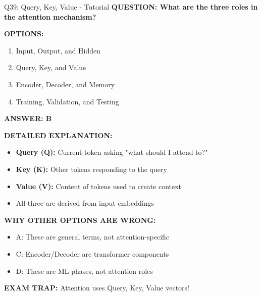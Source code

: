 \documentclass[8pt]{beamer}
\begin{document}
	\begin{frame}{Q39: Query, Key, Value - Tutorial}
		\fontsize{6.5}{7.5}\selectfont
		\textbf{QUESTION: What are the three roles in the attention mechanism?}
		
		\vspace{0.1cm}
		\textbf{OPTIONS:}
		\begin{enumerate}
			\item Input, Output, and Hidden
			\item Query, Key, and Value
			\item Encoder, Decoder, and Memory
			\item Training, Validation, and Testing
		\end{enumerate}
		
		\vspace{0.1cm}
		\textcolor{myblue}{\textbf{ANSWER: B}}
		
		\vspace{0.1cm}
		\textbf{DETAILED EXPLANATION:}
		\begin{itemize}
			\item \textbf{Query (Q):} Current token asking "what should I attend to?"
			\item \textbf{Key (K):} Other tokens responding to the query
			\item \textbf{Value (V):} Content of tokens used to create context
			\item All three are derived from input embeddings
		\end{itemize}
		
		\vspace{0.1cm}
		\textcolor{myred}{\textbf{WHY OTHER OPTIONS ARE WRONG:}}
		\begin{itemize}
			\item \textcolor{myred}{A:} These are general terms, not attention-specific
			\item \textcolor{myred}{C:} Encoder/Decoder are transformer components
			\item \textcolor{myred}{D:} These are ML phases, not attention roles
		\end{itemize}
		
		\textcolor{myred}{\textbf{EXAM TRAP:}} Attention uses \textcolor{myblue}{Query, Key, Value} vectors!
	\end{frame}
	
\end{document}
